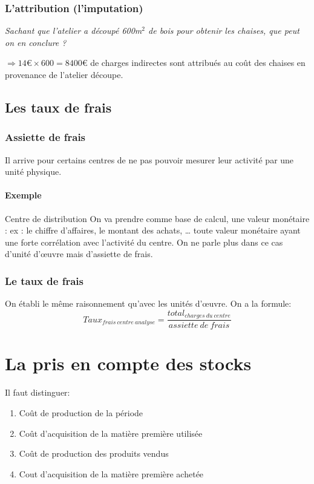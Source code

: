 \documentclass[12pt,a4paper,openany]{report}
\begin{document}
	 \subsubsection{L'attribution (l'imputation)}
	 \textit{Sachant que l'atelier a découpé 600m$^2$ de bois pour obtenir les chaises, que peut on en conclure ?}

	 $\Rightarrow 14\euro \times 600 = 8400\euro$ de charges indirectes sont attribués au coût des chaises en provenance de l'atelier découpe.
	 \subsection{Les taux de frais}
	 \subsubsection{Assiette de frais}
	 Il arrive pour certains centres de ne pas pouvoir mesurer leur activité par une unité physique. 
	 \paragraph{Exemple} Centre de distribution
	 On va prendre comme base de calcul, une valeur monétaire : ex : le chiffre d'affaires, le montant des achats, \ldots
	 toute valeur monétaire ayant une forte corrélation avec l'activité du centre. On ne parle plus dans ce cas d'unité d'\oe{}uvre mais d'assiette de frais.
	 \subsubsection{Le taux de frais}
	 On établi le même raisonnement qu'avec les unités d'\oe{}uvre. On a la formule:
	 $$Taux_{frais~centre~analyse} = \frac{total_{charges~du~centre}}{assiette~de~frais}$$
	 \section{La pris en compte des stocks}
	 Il faut distinguer: 
	 \begin{enumerate}
		 \item Coût de production de la période
		 \item Coût d'acquisition de la matière première utilisée
		 \item Coût de production des produits vendus 
		 \item Cout d'acquisition de la matière première achetée \\
	 \end{enumerate}
\end{document}

